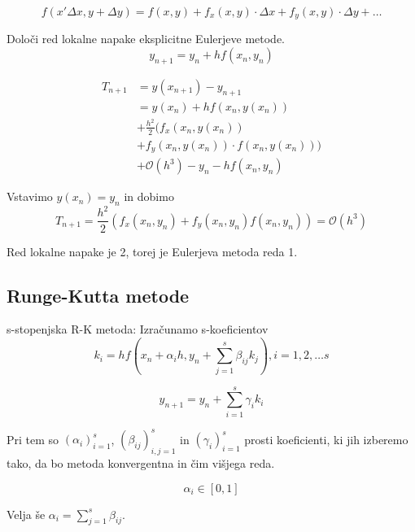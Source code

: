 \documentclass[a4paper,12pt]{article}
\theoremstyle{definition}
\theoremstyle{remark}
\begin{document}
\begin{equation*}
    f(x ' \Delta x, y + \Delta y) = f(x, y) + f_x(x, y) \cdot \Delta x + f_y(x,y) \cdot \Delta y + \dots
\end{equation*}

Določi red lokalne napake eksplicitne Eulerjeve metode.
\begin{equation*}
    y_{n+1} = y_n + h f(x_n, y_n)
\end{equation*}

\begin{align*}
    T_{n+1} &= y(x_{n+1}) - y_{n+1} \\
            &= y(x_n) + h f(x_n, y(x_n)) \\
            &+ \frac{h^2}{2} (f_x(x_n, y(x_n)) \\
            &+ f_y(x_n, y(x_n))\cdot f(x_n, y(x_n))) \\
            &+ \mathcal{O}(h^3) - y_n - h f(x_n, y_n)
\end{align*}

Vstavimo $y(x_n) = y_n$ in dobimo
\begin{equation*}
    T_{n+1} = \frac{h^2}{2} (f_x(x_n, y_n) + f_y(x_n, y_n)f(x_n, y_n)) = \mathcal{O}(h^3)
\end{equation*}

Red lokalne napake je 2, torej je Eulerjeva metoda reda 1.

\subsection{Runge-Kutta metode}
s-stopenjska R-K metoda:
Izračunamo s-koeficientov
\begin{equation*}
    k_i = h f(x_n + \alpha_i h, y_n + \sum_{j=1}^{s} \beta_{ij} k_j), i = 1, 2, \dots s    
\end{equation*}

\begin{equation*}
    y_{n+1} = y_n + \sum_{i=1}^{s} \gamma_i k_i 
\end{equation*}

Pri tem so $(\alpha_i)_{i=1}^s$, $(\beta_{ij})_{i, j=1}^s$ in $(\gamma_i)_{i=1}^s$ prosti koeficienti, ki jih izberemo tako,
da bo metoda konvergentna in čim višjega reda.

\begin{equation*}
    \alpha_i \in [0, 1]
\end{equation*}

Velja še $\alpha_i = \sum_{j=1}^{s} \beta_{ij}$.
\end{document}
